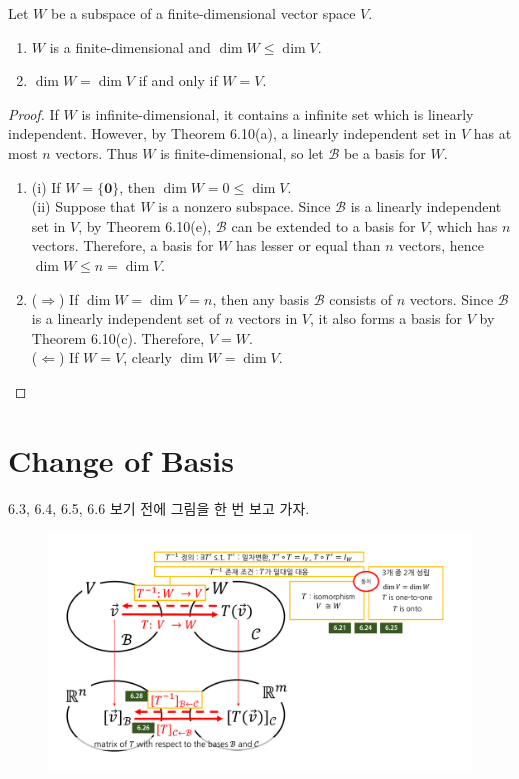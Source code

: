 \begin{theorem}
	Let $W$ be a subspace of a finite-dimensional vector space $V$.
	\begin{enumerate}
		\item $W$ is a finite-dimensional and $\dim W \le \dim V$.
		\item $\dim W = \dim V$ if and only if $W = V$.
	\end{enumerate}
\end{theorem}

\begin{proof}
	If $W$ is infinite-dimensional, it contains a infinite set which is linearly independent. However, by Theorem 6.10(a), a linearly independent set in $V$ has at most $n$ vectors. Thus $W$ is finite-dimensional, so let $\mathcal{B}$ be a basis for $W$.
	\begin{enumerate}
		\item (i) If $W = \{ \textbf{0} \}$, then $\dim W = 0 \le \dim V$. \\
		
		(ii) Suppose that $W$ is a nonzero subspace. Since $\mathcal{B}$ is a linearly independent set in $V$, by Theorem 6.10(e), $\mathcal{B}$ can be extended to a basis for $V$, which has $n$ vectors. Therefore, a basis for $W$ has lesser or equal than $n$ vectors, hence $\dim W \le n = \dim V$.
		\item ($\Rightarrow$) If $\dim W = \dim V = n$, then any basis $\mathcal{B}$ consists of $n$ vectors. Since $\mathcal{B}$ is a linearly independent set of $n$ vectors in $V$, it also forms a basis for $V$ by Theorem 6.10(c). Therefore, $V = W$.  \\
		
		($\Leftarrow$) If $W = V$, clearly $\dim W = \dim V$.
	\end{enumerate}
\end{proof}

\newpage
\section{Change of Basis}

6.3, 6.4, 6.5, 6.6 보기 전에 그림을 한 번 보고 가자.

\begin{figure}[H]
	\begin{center}
		\includegraphics[scale = 0.5]{Figure1.pdf}
	\end{center}
\end{figure}

